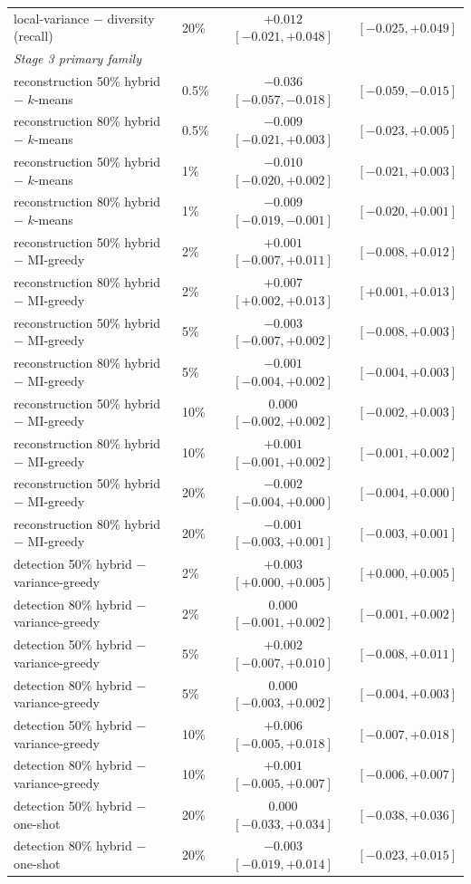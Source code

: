 \begin{tabular}{llcc}
local-variance $-$ diversity (recall) & 20\% & ${+}0.012$ $[-0.021, {+}0.048]$ & $[-0.025, {+}0.049]$ \\
\multicolumn{4}{l}{\emph{Stage 3 primary family}} \\
reconstruction 50\% hybrid $-$ $k$-means & 0.5\% & $-0.036$ $[-0.057, -0.018]$ & $[-0.059, -0.015]$ \\
reconstruction 80\% hybrid $-$ $k$-means & 0.5\% & $-0.009$ $[-0.021, {+}0.003]$ & $[-0.023, {+}0.005]$ \\
reconstruction 50\% hybrid $-$ $k$-means & 1\% & $-0.010$ $[-0.020, {+}0.002]$ & $[-0.021, {+}0.003]$ \\
reconstruction 80\% hybrid $-$ $k$-means & 1\% & $-0.009$ $[-0.019, -0.001]$ & $[-0.020, {+}0.001]$ \\
reconstruction 50\% hybrid $-$ MI-greedy & 2\% & ${+}0.001$ $[-0.007, {+}0.011]$ & $[-0.008, {+}0.012]$ \\
reconstruction 80\% hybrid $-$ MI-greedy & 2\% & ${+}0.007$ $[{+}0.002, {+}0.013]$ & $[{+}0.001, {+}0.013]$ \\
reconstruction 50\% hybrid $-$ MI-greedy & 5\% & $-0.003$ $[-0.007, {+}0.002]$ & $[-0.008, {+}0.003]$ \\
reconstruction 80\% hybrid $-$ MI-greedy & 5\% & $-0.001$ $[-0.004, {+}0.002]$ & $[-0.004, {+}0.003]$ \\
reconstruction 50\% hybrid $-$ MI-greedy & 10\% & $0.000$ $[-0.002, {+}0.002]$ & $[-0.002, {+}0.003]$ \\
reconstruction 80\% hybrid $-$ MI-greedy & 10\% & ${+}0.001$ $[-0.001, {+}0.002]$ & $[-0.001, {+}0.002]$ \\
reconstruction 50\% hybrid $-$ MI-greedy & 20\% & $-0.002$ $[-0.004, {+}0.000]$ & $[-0.004, {+}0.000]$ \\
reconstruction 80\% hybrid $-$ MI-greedy & 20\% & $-0.001$ $[-0.003, {+}0.001]$ & $[-0.003, {+}0.001]$ \\
detection 50\% hybrid $-$ variance-greedy & 2\% & ${+}0.003$ $[{+}0.000, {+}0.005]$ & $[{+}0.000, {+}0.005]$ \\
detection 80\% hybrid $-$ variance-greedy & 2\% & $0.000$ $[-0.001, {+}0.002]$ & $[-0.001, {+}0.002]$ \\
detection 50\% hybrid $-$ variance-greedy & 5\% & ${+}0.002$ $[-0.007, {+}0.010]$ & $[-0.008, {+}0.011]$ \\
detection 80\% hybrid $-$ variance-greedy & 5\% & $0.000$ $[-0.003, {+}0.002]$ & $[-0.004, {+}0.003]$ \\
detection 50\% hybrid $-$ variance-greedy & 10\% & ${+}0.006$ $[-0.005, {+}0.018]$ & $[-0.007, {+}0.018]$ \\
detection 80\% hybrid $-$ variance-greedy & 10\% & ${+}0.001$ $[-0.005, {+}0.007]$ & $[-0.006, {+}0.007]$ \\
detection 50\% hybrid $-$ one-shot & 20\% & $0.000$ $[-0.033, {+}0.034]$ & $[-0.038, {+}0.036]$ \\
detection 80\% hybrid $-$ one-shot & 20\% & $-0.003$ $[-0.019, {+}0.014]$ & $[-0.023, {+}0.015]$ \\
\bottomrule
\end{tabular}